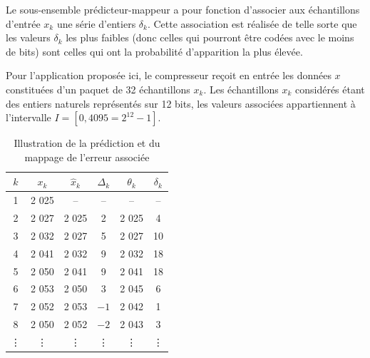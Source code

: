 \documentclass[10pt,fleqn]{article} %
\begin{document}
\begin{minipage}[c]{.55\linewidth}
Le sous-ensemble prédicteur-mappeur a pour fonction
d’associer aux échantillons d’entrée $x_k$ une série
d’entiers $\delta_k$. Cette association est réalisée de telle sorte
que les valeurs $\delta_k$ les plus faibles (donc celles qui pourront
être codées avec le moins de bits) sont celles qui
ont la probabilité d’apparition la plus élevée.

Pour l’application proposée ici, le compresseur reçoit
en entrée les données $x$ constituées d’un paquet de 32
échantillons $x_k$. Les échantillons $x_k$ considérés étant des
entiers naturels représentés sur 12 bits, les valeurs associées
appartiennent à l’intervalle $I = [0 , 4 095 = 2^{12}-1]$.
\end{minipage}
\hfill
\begin{minipage}[c]{.4\linewidth}
\begin{table}[H]
\centering
\begin{tabular}{|c|c|c|c|c|c|}
\hline
$k$ & $x_k$ & $\hat{x}_k$ & $\Delta_k$ & $\theta_k$ & $\delta_k$  \\
\hline
1 & 2 025 & -- & --  & --  & --  \\ \hline
2 & 2 027 & 2 025 & 2 & 2 025 & 4 \\ \hline
3 & 2 032 & 2 027 & 5 & 2 027 & 10 \\ \hline
4 & 2 041 & 2 032 & 9 & 2 032 & 18 \\ \hline
5 & 2 050 & 2 041 & 9 & 2 041 & 18 \\ \hline
6 & 2 053 & 2 050 & 3 & 2 045 & 6 \\ \hline
7 & 2 052 & 2 053 & $-1$ & 2 042 & 1 \\ \hline
8 & 2 050 & 2 052 & $-2$ & 2 043 & 3 \\ \hline
\vdots & \vdots& \vdots&\vdots &\vdots & \vdots\\
\hline
\end{tabular}
\caption{Illustration de la prédiction et du mappage de l’erreur associée\label{tab_02}}
\end{table}
\end{minipage}


\vspace{.25cm}
\end{document}
